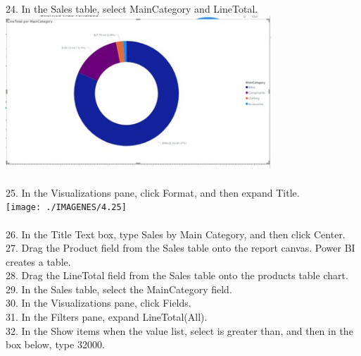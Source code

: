 \documentclass[preprint,12pt]{elsarticle}
\begin{document}
\begin{itemize}
			\\ 24. In the Sales table, select MainCategory and LineTotal.
				\\ \includegraphics[width=10cm]{./IMAGENES/4.24} \\
			\\ 25. In the Visualizations pane, click Format, and then expand Title.
				\\ \texttt{[image: ./IMAGENES/4.25]} \\
			\\ 26. In the Title Text box, type Sales by Main Category, and then click Center.
			\\ 27. Drag the Product field from the Sales table onto the report canvas. Power BI creates a table.
			\\ 28. Drag the LineTotal field from the Sales table onto the products table chart.
			\\ 29. In the Sales table, select the MainCategory field.
			\\ 30. In the Visualizations pane, click Fields.
			\\ 31. In the Filters pane, expand LineTotal(All).
			\\ 32. In the Show items when the value list, select is greater than, and then in the box below, type 32000.

\end{itemize}
\end{document}
